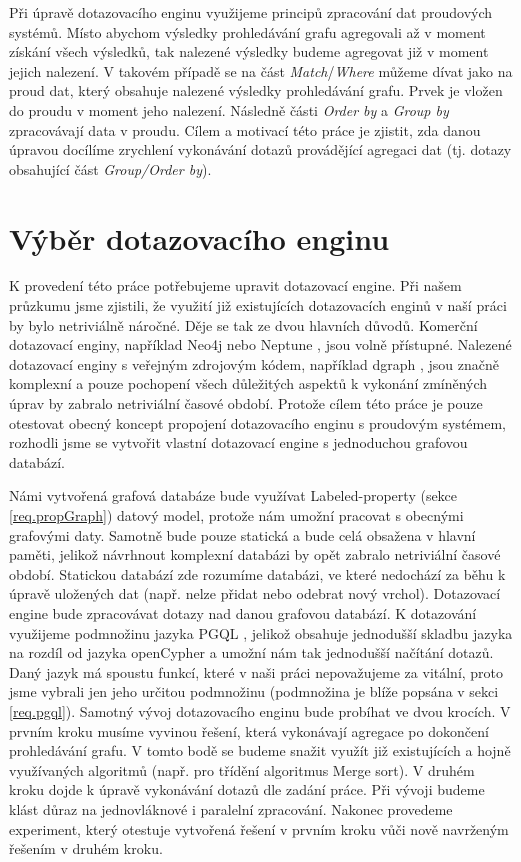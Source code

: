 Při úpravě dotazovacího enginu využijeme principů zpracování dat proudových systémů.
Místo abychom výsledky prohledávání grafu agregovali až v moment získání všech výsledků, tak nalezené výsledky budeme agregovat již v moment jejich nalezení.
V takovém případě se na část \textit{Match}/\textit{Where} můžeme dívat jako na proud dat, který obsahuje nalezené výsledky prohledávání grafu.
Prvek je vložen do proudu v moment jeho nalezení.
Následně části \textit{Order by} a \textit{Group by} zpracovávají data v proudu.
Cílem a motivací této práce je zjistit, zda danou úpravou docílíme zrychlení vykonávání dotazů provádějící agregaci dat (tj. dotazy obsahující část \textit{Group/Order by}).

\section*{Výběr dotazovacího enginu}

K provedení této práce potřebujeme upravit dotazovací engine.
Při našem průzkumu jsme zjistili, že využití již existujících dotazovacích enginů v naší práci by bylo netriviálně náročné.
Děje se tak ze dvou hlavních důvodů.
Komerční dotazovací enginy, například Neo4j \citep{neopropertygraph} nebo Neptune \citep{neptune}, jsou volně přístupné.
Nalezené dotazovací enginy s veřejným zdrojovým kódem, například dgraph \citep{dgraph}, jsou značně komplexní a pouze pochopení všech důležitých aspektů k vykonání zmíněných úprav by zabralo netriviální časové období.
Protože cílem této práce je pouze otestovat obecný koncept propojení dotazovacího enginu s proudovým systémem, rozhodli jsme se vytvořit vlastní dotazovací engine s jednoduchou grafovou databází.

Námi vytvořená grafová databáze bude využívat Labeled-property (sekce \ref{req.propGraph}) datový model, protože nám umožní pracovat s obecnými grafovými daty.
Samotně bude pouze statická a bude celá obsažena v hlavní paměti, jelikož návrhnout komplexní databázi by opět zabralo netriviální časové období.
Statickou databází zde rozumíme databázi, ve které nedochází za běhu k úpravě uložených dat (např. nelze přidat nebo odebrat nový vrchol).
Dotazovací engine bude zpracovávat dotazy nad danou grafovou databází.
K dotazování využijeme podmnožinu jazyka PGQL \citep{pgql}, jelikož obsahuje jednodušší skladbu jazyka na rozdíl od jazyka openCypher \citep{openCypher} a umožní nám tak jednodušší načítání dotazů.
Daný jazyk má spoustu funkcí, které v naši práci nepovažujeme za vitální, proto jsme vybrali jen jeho určitou podmnožinu (podmnožina je blíže popsána v sekci \ref{req.pgql}).
Samotný vývoj dotazovacího enginu bude probíhat ve dvou krocích.
V prvním kroku musíme vyvinou řešení, která vykonávají agregace po dokončení prohledávání grafu.
V tomto bodě se budeme snažit využít již existujících a hojně využívaných algoritmů (např. pro třídění algoritmus Merge sort). 
V druhém kroku dojde k úpravě vykonávání dotazů dle zadání práce.
Při vývoji budeme klást důraz na jednovláknové i paralelní zpracování.
Nakonec provedeme experiment, který otestuje vytvořená řešení v prvním kroku vůči nově navrženým řešením v druhém kroku.

